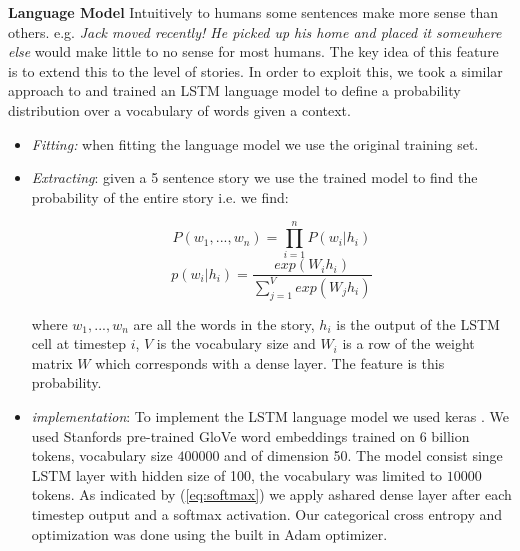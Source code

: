 \documentclass{article}
\begin{document}
\textbf{Language Model} Intuitively to humans some sentences make more sense than others. e.g. \textit{Jack moved recently! He picked up his home and placed it somewhere else} would make little to no sense for most humans. The key idea of this feature is to extend this to the level of stories. In order to exploit this, we took a similar approach to \cite{UWNLP} and trained an LSTM language model to define a probability distribution over a vocabulary of words given a context. 
\begin{itemize}
	\item \textit{Fitting:} when fitting the language model we use the original training set.
	\item \textit{Extracting}: given a 5 sentence story we use the trained model to find the probability of the entire story i.e. we find:
	\begin{multicols}{2}
		\begin{equation}
		P(w_1, ..., w_n) = \prod_{i=1}^{n} P(w_i|h_i)
		\end{equation}\break
		\begin{equation}
		\label{eq:softmax}
		p(w_i|h_i) = \frac{exp(W_ih_i)}{\sum_{j=1}^{V}exp(W_jh_i)}
		\end{equation}
	\end{multicols}
	where $w_1, ..., w_n$ are all the words in the story, $h_i$ is the output of the LSTM cell at timestep $i$, $V$ is the vocabulary size and $W_i$ is a row of the weight matrix $W$ which corresponds with a dense layer. The feature is this probability.
	
	\item \textit{implementation}: To implement the LSTM language model we used keras \cite{KERAS}. We used Stanfords pre-trained GloVe word embeddings trained on 6 billion tokens, vocabulary size $400000$ and of dimension 50. The model consist singe LSTM layer with hidden size of 100, the vocabulary was limited to $10 000$ tokens. As indicated by (\ref{eq:softmax}) we apply ashared dense layer after each timestep output and a softmax activation. Our categorical cross entropy and optimization was done using the built in Adam optimizer.
	
\end{itemize}
\end{document}
